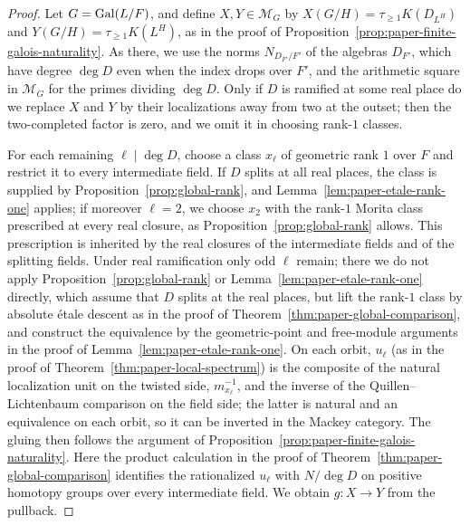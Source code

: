 \begin{proof}
Let $G=\operatorname{Gal}(L/F)$, and define $X,Y\in\mathscr M_G$ by $X(G/H)=\tau_{\ge1}K(D_{L^H})$ and $Y(G/H)=\tau_{\ge1}K(L^H)$, as in the proof of Proposition~\ref{prop:paper-finite-galois-naturality}.
As there, we use the norms $N_{D_{F'}/F'}$ of the algebras $D_{F'}$, which have degree $\deg D$ even when the index drops over $F'$, and the arithmetic square in $\mathscr M_G$ for the primes dividing $\deg D$.
Only if $D$ is ramified at some real place do we replace $X$ and $Y$ by their localizations away from two at the outset; then the two-completed factor is zero, and we omit it in choosing rank-$1$ classes.

For each remaining $\ell\mid\deg D$, choose a class $x_\ell$ of geometric rank $1$ over $F$ and restrict it to every intermediate field.
If $D$ splits at all real places, the class is supplied by Proposition~\ref{prop:global-rank}, and Lemma~\ref{lem:paper-etale-rank-one} applies; if moreover $\ell=2$, we choose $x_2$ with the rank-$1$ Morita class prescribed at every real closure, as Proposition~\ref{prop:global-rank} allows.
This prescription is inherited by the real closures of the intermediate fields and of the splitting fields.
Under real ramification only odd $\ell$ remain; there we do not apply Proposition~\ref{prop:global-rank} or Lemma~\ref{lem:paper-etale-rank-one} directly, which assume that $D$ splits at the real places, but lift the rank-$1$ class by absolute \'etale descent as in the proof of Theorem~\ref{thm:paper-global-comparison}, and construct the equivalence by the geometric-point and free-module arguments in the proof of Lemma~\ref{lem:paper-etale-rank-one}.
On each orbit, $u_\ell$ (as in the proof of Theorem~\ref{thm:paper-local-spectrum}) is the composite of the natural localization unit on the twisted side, $m_{x_\ell}^{-1}$, and the inverse of the Quillen--Lichtenbaum comparison on the field side; the latter is natural and an equivalence on each orbit, so it can be inverted in the Mackey category.
The gluing then follows the argument of Proposition~\ref{prop:paper-finite-galois-naturality}.
Here the product calculation in the proof of Theorem~\ref{thm:paper-global-comparison} identifies the rationalized $u_\ell$ with $N/\deg D$ on positive homotopy groups over every intermediate field.
We obtain $g\colon X\to Y$ from the pullback.


\end{proof}
